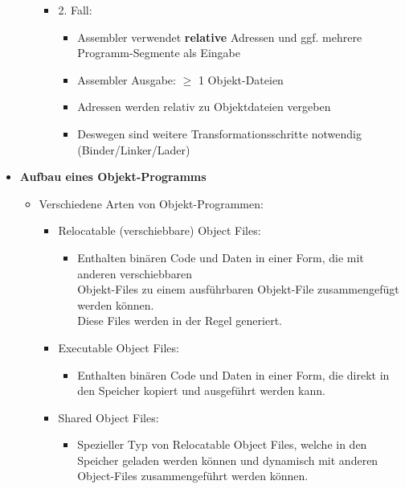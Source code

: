 \begin{itemize}
\begin{itemize}
\begin{itemize}
                        \item 2. Fall:
                            \begin{itemize}
                                \item Assembler verwendet \textbf{relative} Adressen und ggf. mehrere Programm-Segmente als Eingabe
                                \item Assembler Ausgabe: $\geq$ 1 Objekt-Dateien
                                \item Adressen werden relativ zu Objektdateien vergeben
                                \item Deswegen sind weitere Transformationsschritte notwendig (Binder/Linker/Lader)
                            \end{itemize}
                    \end{itemize}
            \end{itemize}

        \item \textbf{Aufbau eines Objekt-Programms}
            \begin{itemize}
                \item Verschiedene Arten von Objekt-Programmen:
                    \begin{itemize}
                        \item Relocatable (verschiebbare) Object Files:
                            \begin{itemize}
                                \item[] Enthalten binären Code und Daten in einer Form, die mit anderen 
                                        verschiebbaren \\ Objekt-Files zu einem ausführbaren Objekt-File zusammengefügt werden können. \\
                                        Diese Files werden in der Regel generiert.
                            \end{itemize}
                        \item Executable Object Files:
                            \begin{itemize}
                                \item[] Enthalten binären Code und Daten in einer Form, die direkt in den Speicher kopiert
                                        und ausgeführt werden kann. 
                            \end{itemize}
                        \item Shared Object Files:
                            \begin{itemize}
                                \item[] Spezieller Typ von Relocatable Object Files, welche in den Speicher geladen werden können
                                        und dynamisch mit anderen Object-Files zusammengeführt werden können.
                            \end{itemize}
                    \end{itemize}


\end{itemize}
\end{itemize}

